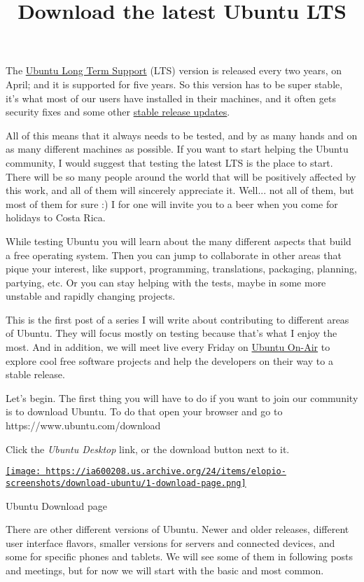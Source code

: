 \documentclass[12pt]{article}
\title{Download the latest Ubuntu LTS}
\begin{document}
The \href{https://wiki.ubuntu.com/LTS}{Ubuntu Long Term Support} (LTS) version
is released every two years, on April; and it is supported for five years. So
this version has to be super stable, it's what most of our users have installed
in their machines, and it often gets security fixes and some other
\href{https://wiki.ubuntu.com/StableReleaseUpdates}{stable release updates}.

All of this means that it always needs to be tested, and by as many hands and on
as many different machines as possible. If you want to start helping the Ubuntu
community, I would suggest that testing the latest LTS is the place to start.
There will be so many people around the world that will be positively affected
by this work, and all of them will sincerely appreciate it. Well... not all of
them, but most of them for sure :) I for one will invite you to a beer when you
come for holidays to Costa Rica.

While testing Ubuntu you will learn about the many different aspects that build
a free operating system. Then you can jump to collaborate in other areas that
pique your interest, like support, programming, translations, packaging,
planning, partying, etc. Or you can stay helping with the tests, maybe in some
more unstable and rapidly changing projects.

This is the first post of a series I will write about contributing to different
areas of Ubuntu. They will focus mostly on testing because that's what I enjoy
the most. And in addition, we will meet live every Friday on
\href{http://ubuntuonair.com/}{Ubuntu On-Air} to explore cool free software
projects and help the developers on their way to a stable release.

Let's begin. The first thing you will have to do if you want to join our
community is to download Ubuntu. To do that open your browser and go to
https://www.ubuntu.com/download

Click the \emph{Ubuntu Desktop} link, or the download button next to it.

\begin{center}
  \href{
    https://ia600208.us.archive.org/24/items/elopio-screenshots/download-ubuntu/1-download-page.png}{
    \texttt{[image: 
    https://ia600208.us.archive.org/24/items/elopio-screenshots/download-ubuntu/1-download-page.png]}
  }
  \caption{Ubuntu Download page}
\end{center}

There are other different versions of Ubuntu. Newer and older releases,
different user interface flavors, smaller versions for servers and connected
devices, and some for specific phones and tablets. We will see some of them
in following posts and meetings, but for now we will start with the basic and
most common.
\end{document}
